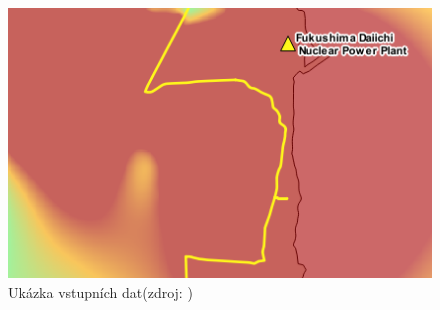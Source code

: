 \begin{figure}[H]
    \centering
    \includegraphics[scale=0.6]{./pictures/ukazka_vstupnich_dat.png}
    \caption[Ukázka vstupních dat]{Ukázka vstupních dat(zdroj: )}
    \label{fig:vstup}
\end{figure}
  			
